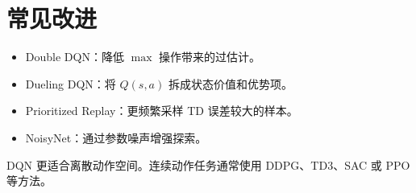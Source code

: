\section{常见改进}

\begin{itemize}
  \item Double DQN：降低 $\max$ 操作带来的过估计。
  \item Dueling DQN：将 $Q(s,a)$ 拆成状态价值和优势项。
  \item Prioritized Replay：更频繁采样 TD 误差较大的样本。
  \item NoisyNet：通过参数噪声增强探索。
\end{itemize}

\begin{warningbox}
DQN 更适合离散动作空间。连续动作任务通常使用 DDPG、TD3、SAC 或 PPO 等方法。
\end{warningbox}
